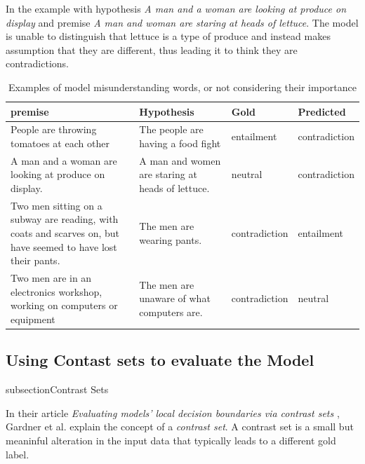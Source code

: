 \documentclass[twocolumn]{article}
\begin{document}
In the example with hypothesis \textit{A man and a woman are looking at produce
on display} and premise \textit{A man and woman are staring at heads of
lettuce}. The model is unable to distinguish that lettuce is a type of produce
and instead makes assumption that they are different, thus leading it to think
they are contradictions.

\begin{table}[t]
\caption{Examples of model misunderstanding words, or not considering their importance}
\begin{tabular}{|p{4cm}|p{4cm}|p{2.5cm}|p{2.5cm}|}
\hline
\textbf{premise}                                                                        & \textbf{Hypothesis}                & \textbf{Gold} & \textbf{Predicted} \\ \hline
People are throwing tomatoes at each other                                                                    & The people are having a food fight               & entailment                         & contradiction      \\ \hline
A man and a woman are looking at produce on display.                                                          & A man and women are staring at heads of lettuce. & neutral                            & contradiction      \\ \hline
Two men sitting on a subway are reading, with coats and scarves on, but have seemed to have lost their pants. & The men are wearing pants.                       & contradiction                      & entailment         \\ \hline
Two men are in an electronics workshop, working on computers or equipment                                     & The men are unaware of what computers are.       & contradiction                      & neutral            \\ \hline
\end{tabular}
\end{table}


\subsection{Using Contast sets to evaluate the Model}
subsection{Contrast Sets}

In their article \textit{Evaluating models' local decision boundaries via
contrast sets} \cite{gardner2020evaluating}, Gardner et al. explain the concept
of a \textit{contrast set}. A contrast set is a small but meaninful alteration
in the input data that typically leads to a different gold label.
\end{document}
